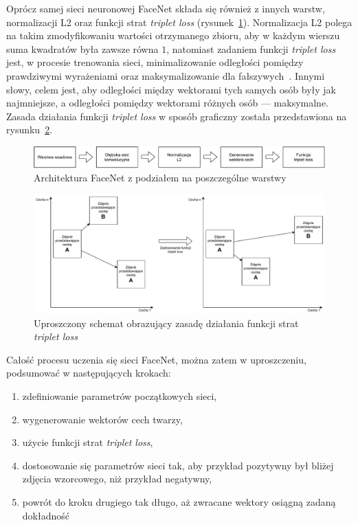 Oprócz samej sieci neuronowej FaceNet składa się również z innych warstw, normalizacji L2 oraz
funkcji strat \textit{triplet loss} (rysunek~\ref{fig:facenet_arch}).
Normalizacja L2 polega na takim zmodyfikowaniu wartości otrzymanego zbioru, aby w każdym wierszu
suma kwadratów była zawsze równa $1$,
natomiast zadaniem funkcji \textit{triplet loss} jest, w procesie trenowania sieci,
minimalizowanie odległości pomiędzy prawdziwymi
wyrażeniami oraz maksymalizowanie dla fałszywych~\cite{chechik2010large}.
Innymi słowy, celem jest, aby odległości między wektorami tych samych osób były jak najmniejsze,
a odległości pomiędzy wektorami różnych osób --- maksymalne.
Zasada działania funkcji \textit{triplet loss} w sposób graficzny
została przedstawiona na rysunku~\ref{fig:triplet_loss}.

\begin{figure}[]
    \centering
    \includegraphics[width=1\textwidth]{images/facenet_arch}
    \caption{ Architektura FaceNet z podziałem na poszczególne warstwy }
    \customsource
    \label{fig:facenet_arch}
\end{figure}

\begin{figure}[]
    \centering
    \includegraphics[width=1\textwidth]{images/triplet_loss}
    \caption{ Uproszczony schemat obrazujący zasadę działania funkcji strat \textit{triplet loss} }
    \customsource
    \label{fig:triplet_loss}
\end{figure}

Całość procesu uczenia się sieci FaceNet, można zatem w uproszczeniu, podsumować w następujących krokach:

\begin{enumerate}
    \item zdefiniowanie parametrów początkowych sieci,
    \item wygenerowanie wektorów cech twarzy,
    \item użycie funkcji strat \textit{triplet loss},
    \item dostosowanie się parametrów sieci tak, aby przykład pozytywny był bliżej zdjęcia wzorcowego, niż przykład negatywny,
    \item powrót do kroku drugiego tak długo, aż zwracane wektory osiągną zadaną dokładność
\end{enumerate}

